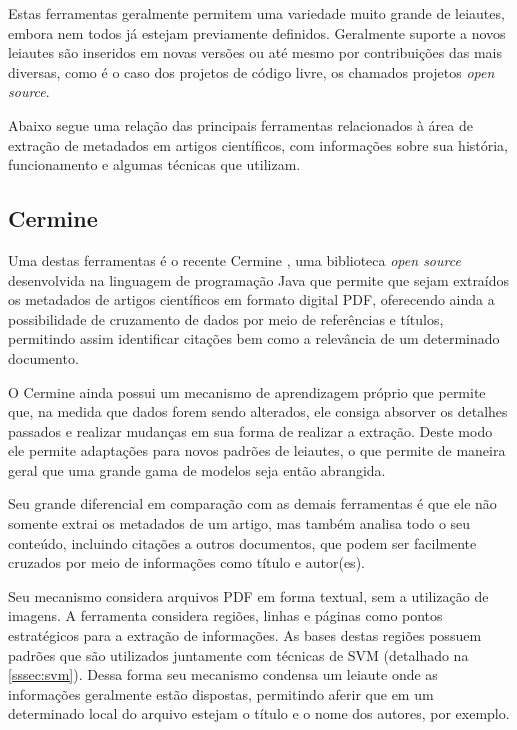 Estas ferramentas geralmente permitem uma variedade muito grande de leiautes, embora nem todos já estejam previamente definidos. Geralmente suporte a novos leiautes são inseridos em novas versões ou até mesmo por contribuições das mais diversas, como é o caso dos projetos de código livre, os chamados projetos \textit{open source}.

Abaixo segue uma relação das principais ferramentas relacionados à área de extração de metadados em artigos científicos, com informações sobre sua história, funcionamento e algumas técnicas que utilizam.

\subsection{Cermine}
\label{ssec:cermine}


Uma destas ferramentas é o recente Cermine \cite{cermine}, uma biblioteca \textit{open source} desenvolvida na linguagem de programação Java que permite que sejam extraídos os metadados de artigos científicos em formato digital PDF, oferecendo ainda a possibilidade de cruzamento de dados por meio de referências e títulos, permitindo assim identificar citações bem como a relevância de um determinado documento.

O Cermine ainda possui um mecanismo de aprendizagem próprio que permite que, na medida que dados forem sendo alterados, ele consiga absorver os detalhes passados e realizar mudanças em sua forma de realizar a extração. Deste modo ele permite adaptações para novos padrões de leiautes, o que permite de maneira geral que uma grande gama de modelos seja então abrangida. 

Seu grande diferencial em comparação com as demais ferramentas é que ele não somente extrai os metadados de um artigo, mas também analisa todo o seu conteúdo, incluindo citações a outros documentos, que podem ser facilmente cruzados por meio de informações como título e autor(es).

Seu mecanismo considera arquivos PDF em forma textual, sem a utilização de imagens. A ferramenta considera regiões, linhas e páginas como pontos estratégicos para a extração de informações. As bases destas regiões possuem padrões que são utilizados juntamente com técnicas de SVM \cite{Han-SVM} (detalhado na \autoref{sssec:svm}). Dessa forma seu mecanismo condensa um leiaute onde as informações geralmente estão dispostas, permitindo aferir que em um determinado local do arquivo estejam o título e o nome dos autores, por exemplo. 

